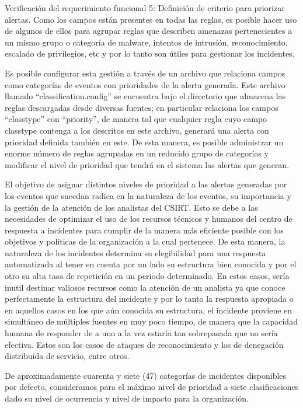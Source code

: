 \begin{section}{Verificación del requerimiento funcional 5: Definición de criterio para priorizar alertas.}
    Como los campos están presentes en todas las reglas, es posible hacer uso de algunos de ellos para agrupar reglas que describen amenazas pertenecientes a un mismo grupo o categoría de malware, intentos de intrusión, reconocimiento, escalado de privilegios, etc y por lo tanto son útiles para gestionar los incidentes. \par
	Es posible configurar esta gestión a través de un archivo que relaciona campos como categorías de eventos con prioridades de la alerta generada. Este archivo llamado “classification.config” se encuentra bajo el directorio que almacena las reglas descargadas desde diversas fuentes; en particular relaciona los campos “classtype” con “priority”, de manera tal que cualquier regla cuyo campo classtype contenga a los descritos en este archivo, generará una alerta con prioridad definida también en este. De esta manera, es posible administrar un enorme número de reglas agrupadas en un reducido grupo de categorías y modificar el nivel de prioridad que tendrá en el sistema las alertas que generan. \par
	El objetivo de asignar distintos niveles de prioridad a las alertas generadas por los eventos que sucedan radica en la naturaleza de los eventos, su importancia y la gestión de la atención de los analistas del CSIRT. Esto se debe a las necesidades de optimizar el uso de los recursos técnicos y humanos del centro de respuesta a incidentes para cumplir de la manera más eficiente posible con los objetivos y políticas de la organización a la cual pertenece. De esta manera, la naturaleza de los incidentes determina su elegibilidad para una respuesta automatizada al tener en cuenta por un lado su estructura bien conocida y por el otro su alta tasa de repetición en un periodo determinado. En estos casos, sería inutil destinar valiosos recursos como la atención de un analista ya que conoce perfectamente la estructura del incidente y por lo tanto la respuesta apropiada o en aquellos casos en los que aún conocida su estructura, el incidente proviene en simultáneo de múltiples fuentes en muy poco tiempo, de manera que la capacidad humana de responder de a uno a la vez estaría tan sobrepasada que no sería efectiva. Estos son los casos de ataques de reconocimiento y los de denegación distribuida de servicio, entre otros. \par
	De aproximadamente cuarenta y siete (47) categorías de incidentes disponibles por defecto, consideramos para el máximo nivel de prioridad a siete clasificaciones dado su nivel de ocurrencia y nivel de impacto para la organización. 

\end{section}
